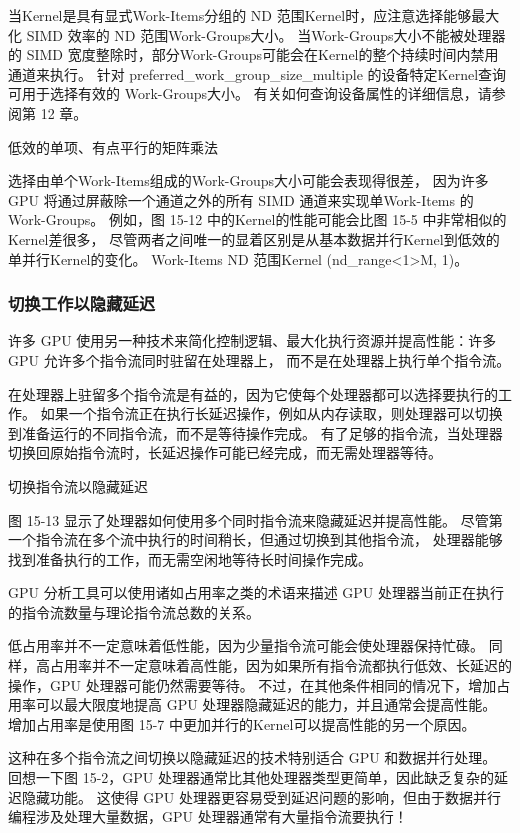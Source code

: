 当Kernel是具有显式Work-Items分组的 ND 范围Kernel时，应注意选择能够最大化 SIMD 效率的 ND 范围Work-Groups大小。 
当Work-Groups大小不能被处理器的 SIMD 宽度整除时，部分Work-Groups可能会在Kernel的整个持续时间内禁用通道来执行。 
针对 preferred\_work\_group\_size\_multiple 的设备特定Kernel查询可用于选择有效的 Work-Groups大小。 
有关如何查询设备属性的详细信息，请参阅第 12 章。

{\color{red} 低效的单项、有点平行的矩阵乘法}

选择由单个Work-Items组成的Work-Groups大小可能会表现得很差，
因为许多 GPU 将通过屏蔽除一个通道之外的所有 SIMD 通道来实现单Work-Items 的 Work-Groups。 
例如，图 15-12 中的Kernel的性能可能会比图 15-5 中非常相似的Kernel差很多，
尽管两者之间唯一的显着区别是从基本数据并行Kernel到低效的单并行Kernel的变化。 
Work-Items ND 范围Kernel (nd\_range<1>{M, 1})。

\subsubsection{切换工作以隐藏延迟}
许多 GPU 使用另一种技术来简化控制逻辑、最大化执行资源并提高性能：许多 GPU 允许多个指令流同时驻留在处理器上，
而不是在处理器上执行单个指令流。

在处理器上驻留多个指令流是有益的，因为它使每个处理器都可以选择要执行的工作。 
如果一个指令流正在执行长延迟操作，例如从内存读取，则处理器可以切换到准备运行的不同指令流，而不是等待操作完成。 
有了足够的指令流，当处理器切换回原始指令流时，长延迟操作可能已经完成，而无需处理器等待。

{\color{red} 切换指令流以隐藏延迟}

图 15-13 显示了处理器如何使用多个同时指令流来隐藏延迟并提高性能。 
尽管第一个指令流在多个流中执行的时间稍长，但通过切换到其他指令流，
处理器能够找到准备执行的工作，而无需空闲地等待长时间操作完成。

GPU 分析工具可以使用诸如占用率之类的术语来描述 GPU 处理器当前正在执行的指令流数量与理论指令流总数的关系。

低占用率并不一定意味着低性能，因为少量指令流可能会使处理器保持忙碌。 
同样，高占用率并不一定意味着高性能，因为如果所有指令流都执行低效、长延迟的操作，GPU 处理器可能仍然需要等待。 
不过，在其他条件相同的情况下，增加占用率可以最大限度地提高 GPU 处理器隐藏延迟的能力，并且通常会提高性能。 
增加占用率是使用图 15-7 中更加并行的Kernel可以提高性能的另一个原因。

这种在多个指令流之间切换以隐藏延迟的技术特别适合 GPU 和数据并行处理。 
回想一下图 15-2，GPU 处理器通常比其他处理器类型更简单，因此缺乏复杂的延迟隐藏功能。 
这使得 GPU 处理器更容易受到延迟问题的影响，但由于数据并行编程涉及处理大量数据，GPU 处理器通常有大量指令流要执行！

